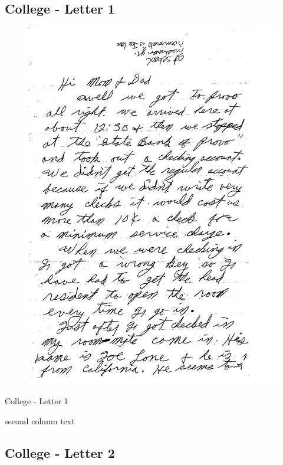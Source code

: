 \documentclass{beamer}
\begin{document}
\subsection{College - Letter 1}
\begin{figure}
  \includegraphics[scale=0.5]{1961/1961_letter_1_1.jpg}
\end{figure}

\begin{frame}{College - Letter 1}
\begin{multicols}{2}


second column text
\end{multicols}

\end{frame}



\subsection{College - Letter 2}
\begin{frame}{College - Letter 2




\end{frame}
\end{document}
